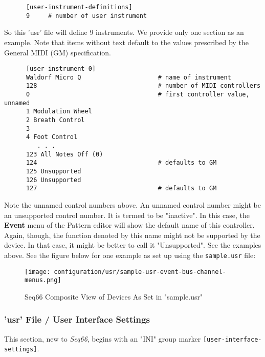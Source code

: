   \begin{verbatim}
      [user-instrument-definitions]
      9     # number of user instrument
   \end{verbatim}

   So this 'usr' file will define 9 instruments.  We provide only one section
   as an example.  Note that items without text default to the values
   prescribed by the General MIDI (GM) specification.

   \begin{verbatim}
      [user-instrument-0]
      Waldorf Micro Q                     # name of instrument
      128                                 # number of MIDI controllers
      0                                   # first controller value, unnamed
      1 Modulation Wheel
      2 Breath Control
      3 
      4 Foot Control
         . . .
      123 All Notes Off (0)
      124                                 # defaults to GM
      125 Unsupported
      126 Unsupported
      127                                 # defaults to GM
   \end{verbatim}

   Note the unnamed control numbers above.
   An unnamed control number might be an unsupported control number.
   It is termed to be "inactive".  In this case, the \textbf{Event} menu of
   the Pattern editor will show the default name of this controller.
   Again, though, the function denoted by this name might not be supported by
   the device.  In that case, it might be better to call it "Unsupported".
   See the examples above.  See the figure below for one example as set up using
   the \texttt{sample.usr} file:


\begin{figure}[H]
   \centering 
   \texttt{[image: configuration/usr/sample-usr-event-bus-channel-menus.png]}
   \caption{Seq66 Composite View of Devices As Set in "sample.usr"}
   \label{fig:sample_usr_event_bus_channel_menus}
\end{figure}

\subsubsection{'usr' File / User Interface Settings}
\label{subsubsec:usr_file_user_interface_settings}

   This section, new to \textsl{Seq66}, begins with an
   "INI" group marker \texttt{[user-interface-settings]}.

